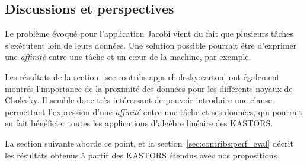 \subsection{Discussions et perspectives}

Le problème évoqué pour l'application Jacobi vient du fait que plusieurs tâches s'exécutent loin de leurs données. Une solution possible pourrait être d'exprimer une \emph{affinité} entre une tâche et un cœur de la machine, par exemple.

Les résultats de la section~\ref{sec:contribs:apps:cholesky:carton} ont également montrés l'importance de la proximité des données pour les différents noyaux de Cholesky.
Il semble donc très intéressant de pouvoir introduire une clause permettant l'expression d'une \emph{affinité} entre une tâche et ses données, qui pourrait en fait bénéficier toutes les applications d'algèbre linéaire des KASTORS.

La section suivante aborde ce point, et la section~\ref{sec:contribs:perf_eval} décrit les résultats obtenus à partir des KASTORS étendus avec nos propositions.

